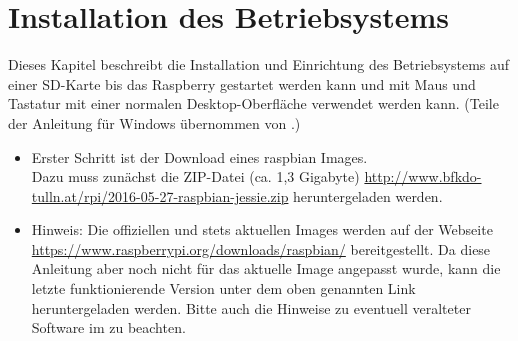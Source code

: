 \label{sec:schritte}

\section{Installation des Betriebsystems}
\label{sec:stepsinstall}
Dieses Kapitel beschreibt die Installation und Einrichtung des Betriebsystems auf einer SD-Karte bis das Raspberry gestartet werden kann und mit Maus und Tastatur mit einer normalen Desktop-Oberfläche verwendet werden kann. (Teile der Anleitung für Windows übernommen von \cite{install}.)

\begin{itemize}

	\item {Erster Schritt ist der Download eines raspbian Images.\\
		Dazu muss zunächst die ZIP-Datei (ca. 1,3 Gigabyte) \url{http://www.bfkdo-tulln.at/rpi/2016-05-27-raspbian-jessie.zip} heruntergeladen werden.
		}
	\item {\begin{em}Hinweis: Die offiziellen und stets aktuellen Images werden auf der Webseite \url{https://www.raspberrypi.org/downloads/raspbian/} bereitgestellt.
		Da diese Anleitung aber noch nicht für das aktuelle Image angepasst wurde, kann die letzte funktionierende Version unter dem oben genannten Link heruntergeladen werden.
		Bitte auch die Hinweise zu eventuell veralteter Software im  zu beachten.
		\end{em}
		}

\end{itemize}
